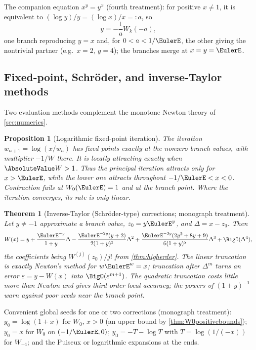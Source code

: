 \documentclass[11pt]{article}
\newtheorem{theorem}{Theorem}[section]
\newtheorem{proposition}[proposition]{Proposition}
\theoremstyle{remark}
\begin{document}
The companion equation \(x^y=y^x\) (fourth treatment): for positive
\(x\ne1\), it is equivalent to \((\log y)/y=(\log x)/x=:a\), so
\begin{equation}\label{cmp:eq:xyyx}
 y=-\frac1aW_k(-a),
\end{equation}
one branch reproducing \(y=x\) and, for \(0<a<1/\EulerE\), the other giving the
nontrivial partner (e.g.\ \(x=2\), \(y=4\)); the branches merge at
\(x=y=\EulerE\).

\subsection{Fixed-point, Schr\"oder, and inverse-Taylor methods}

Two evaluation methods complement the monotone Newton theory of
\cref{sec:numerics}.

\begin{proposition}[Logarithmic fixed-point iteration]
\label{cmp:prop:fixed-point}
The iteration \(w_{n+1}=\log(x/w_n)\) has fixed points exactly at the
nonzero branch values, with multiplier \(-1/W\) there.  It is locally
attracting exactly when \(\AbsoluteValue W>1\).  Thus the principal iteration attracts
only for \(x>\EulerE\), while the lower one attracts throughout
\(-1/\EulerE<x<0\).  Contraction fails at \(W_0(\EulerE)=1\) and at the branch point.
Where the iteration converges, its rate is only linear.
\end{proposition}

\begin{theorem}[Inverse-Taylor (Schr\"oder-type) corrections; monograph
treatment]\label{cmp:thm:inverse-taylor}
Let \(y\ne-1\) approximate a branch value, \(z_0=y\EulerE^y\), and
\(\Delta=x-z_0\).  Then
\begin{equation}\label{cmp:eq:schroeder}
 W(x)=y+\frac{\EulerE^{-y}}{1+y}\Delta
 -\frac{\EulerE^{-2y}(y+2)}{2(1+y)^3}\Delta^2
 +\frac{\EulerE^{-3y}(2y^2+8y+9)}{6(1+y)^5}\Delta^3
 +\BigO(\Delta^4),
\end{equation}
the coefficients being \(W^{(j)}(z_0)/j!\) from
\cref{thm:higherder}.  The linear truncation is exactly Newton's method for
\(w\EulerE^w=x\); truncation after \(\Delta^m\) turns an error
\(\varepsilon=y-W(x)\) into \(\BigO(\varepsilon^{m+1})\).  The quadratic
truncation costs little more than Newton and gives third-order local
accuracy; the powers of \((1+y)^{-1}\) warn against poor seeds near the
branch point.
\end{theorem}

Convenient global seeds for one or two corrections (monograph treatment):
\(y_0=\log(1+x)\) for \(W_0\), \(x>0\) (an upper bound by
\cref{thm:W0positivebounds}); \(y_0=x\) for \(W_0\) on \((-1/\EulerE,0)\);
\(y_0=-T-\log T\) with \(T=\log(1/(-x))\) for \(W_{-1}\); and the Puiseux
or logarithmic expansions at the ends.
\end{document}
